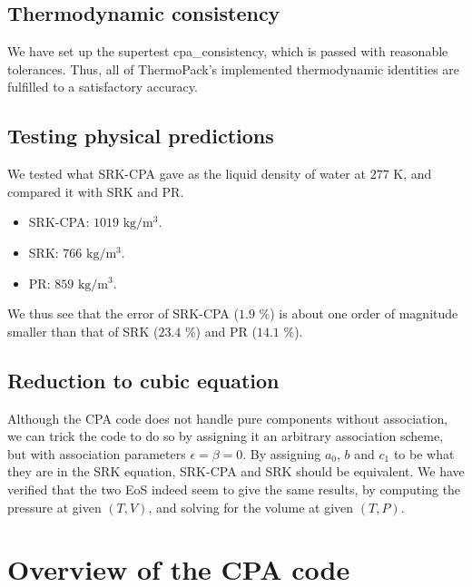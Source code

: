 \documentclass[10pt, a4paper]{article}
\begin{document}
\subsection{Thermodynamic consistency}
We have set up the supertest cpa\_consistency, which is passed with reasonable tolerances. Thus, all of ThermoPack's implemented thermodynamic identities are fulfilled to a satisfactory accuracy.

\subsection{Testing physical predictions}
We tested what SRK-CPA gave as the liquid density of water at $277$ K, and compared it with SRK and PR.
\begin{itemize}
\item SRK-CPA: $1019$ $\mathrm{kg}/\mathrm{m}^3$.
\item SRK: $766$ $\mathrm{kg}/\mathrm{m}^3$.
\item PR: $859$ $\mathrm{kg}/\mathrm{m}^3$.
\end{itemize}
We thus see that the error of SRK-CPA ($1.9$ \%) is about one order of magnitude smaller than that of SRK ($23.4$ \%) and PR ($14.1$ \%).

\subsection{Reduction to cubic equation}
Although the CPA code does not handle pure components without association, we can trick the code to do so by assigning it an arbitrary association scheme, but with association parameters $\epsilon = \beta = 0$. By assigning $a_0$, $b$ and $c_1$ to be what they are in the SRK equation, SRK-CPA and SRK should be equivalent. We have verified that the two EoS indeed seem to give the same results, by computing the pressure at given $(T,V)$, and solving for the volume at given $(T,P)$.

\section{Overview of the CPA code}
\end{document}
